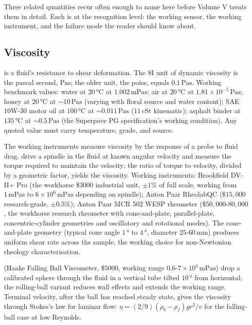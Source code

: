 Three related quantities recur often enough to name here before
Volume V treats them in detail. Each is at the recognition level:
the working sensor, the working instrument, and the failure mode
the reader should know about.

\subsection{Viscosity}

 is a fluid's resistance to shear deformation.
The SI unit of dynamic viscosity is the pascal second, $\si{
\pascal\second}$; the older unit, the poise, equals $0.1\,\si{
\pascal\second}$. Working benchmark values: water at $20\,\si{
\degreeCelsius}$ at $1.002\,\si{\milli\pascal\second}$; air at
$20\,\si{\degreeCelsius}$ at $1.81 \times 10^{-5}\,\si{\pascal
\second}$; honey at $20\,\si{\degreeCelsius}$ at $\sim 10\,\si{
\pascal\second}$ (varying with floral source and water content);
SAE 10W-30 motor oil at $100\,\si{\degreeCelsius}$ at $\sim
0.011\,\si{\pascal\second}$ ($11\,\text{cSt}$ kinematic);
asphalt binder at $135\,\si{\degreeCelsius}$ at $\sim 0.5\,\si{
\pascal\second}$ (the Superpave PG specification's working
condition). Any quoted value must carry temperature, grade, and
source.

The working instruments measure viscosity by the response of a
probe to fluid drag.  drive a
spindle in the fluid at known angular velocity and measure the
torque required to maintain the velocity; the ratio of torque to
velocity, divided by a geometric factor, yields the viscosity.
Working instruments: Brookfield DV-II+ Pro (the workhorse
\$$3000$ industrial unit, $\pm 1\%$ of full scale, working from
$1\,\si{\milli\pascal\second}$ to $6 \times 10^{6}\,\si{\milli
\pascal\second}$ depending on spindle); Anton Paar RheolabQC
(\$$15{,}000$ research-grade, $\pm 0.5\%$); Anton Paar MCR 502
WESP rheometer (\$$50{,}000$-$80{,}000$, the workhorse research
rheometer with cone-and-plate, parallel-plate, concentric-cylinder
geometries and oscillatory and rotational modes). The
cone-and-plate geometry (typical cone angle $1\,\si{\degree}$ to
$4\,\si{\degree}$, diameter $25$-$60\,\si{\milli\meter}$) produces
uniform shear rate across the sample, the working choice for
non-Newtonian rheology characterisation.

 (Haake Falling Ball
Viscometer, $\$5000$, working range $0.6$-$7 \times 10^{4}\,\si{
\milli\pascal\second}$) drop a calibrated sphere through the
fluid in a vertical tube tilted $10\,\si{\degree}$ from
horizontal; the rolling-ball variant reduces wall effects and
extends the working range. Terminal velocity, after the ball has
reached steady state, gives the viscosity through Stokes's law
for laminar flow: $\eta = (2/9)(\rho_{b} - \rho_{f})g r^{2}/v$ for
the falling-ball case at low Reynolds.

